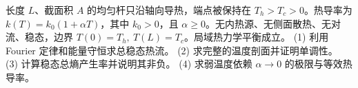 长度 \(L\)、截面积 \(A\) 的均匀杆只沿轴向导热，端点被保持在 \(T_h>T_c>0\)。热导率为 \(k(T)=k_0(1+\alpha T)\)，其中 \(k_0>0\)，且 \(\alpha\ge0\)。无内热源、无侧面散热、无对流、稳态，边界 \(T(0)=T_h,\ T(L)=T_c\)。局域热力学平衡成立。
(1) 利用 Fourier 定律和能量守恒求总稳态热流。
(2) 求完整的温度剖面并证明单调性。
(3) 计算稳态总熵产生率并说明其非负。
(4) 求弱温度依赖 \(\alpha\to0\) 的极限与等效热导率。
